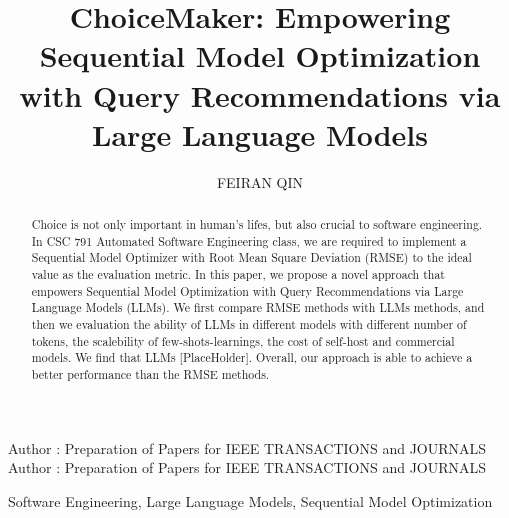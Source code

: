 \documentclass{ieeeaccess}
\begin{document}

\title{ChoiceMaker: Empowering Sequential Model Optimization with Query Recommendations via Large Language Models}
\author{\uppercase{Feiran Qin}}
\address[1]{North Carolina State University, Raleigh, NC 27606 USA (e-mail: fqin2@ncsu.edu)}


\tfootnote{
}

\markboth
{Author \headeretal: Preparation of Papers for IEEE TRANSACTIONS and JOURNALS}
{Author \headeretal: Preparation of Papers for IEEE TRANSACTIONS and JOURNALS}

\corresp{
    }

\begin{abstract}
Choice is not only important in human's lifes, but also crucial to software engineering. In CSC 791 Automated Software Engineering class, we are required to implement a Sequential Model Optimizer with Root Mean Square Deviation (RMSE) to the ideal value as the evaluation metric. In this paper, we propose a novel approach that empowers Sequential Model Optimization with Query Recommendations via Large Language Models (LLMs). We first compare RMSE methods with LLMs methods, and then we evaluation the ability of LLMs in different models with different number of tokens, the scalebility of few-shots-learnings, the cost of self-host and commercial models. We find that LLMs [PlaceHolder]. Overall, our approach is able to achieve a better performance than the RMSE methods. 
\end{abstract}

\begin{keywords}
Software Engineering, Large Language Models, Sequential Model Optimization
\end{keywords}

\titlepgskip=-15pt

\maketitle
\end{document}
